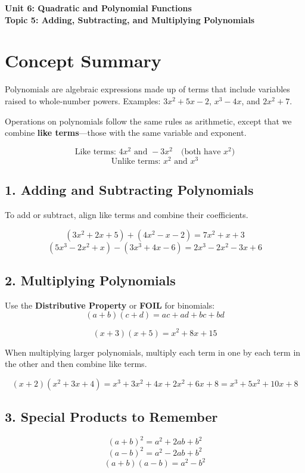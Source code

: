 \documentclass[12pt]{article}
\begin{document}
\begin{center}
    \LARGE \textbf{Unit 6: Quadratic and Polynomial Functions} \\[6pt]
    \Large \textbf{Topic 5: Adding, Subtracting, and Multiplying Polynomials}
\end{center}

\vspace{1em}

\section*{Concept Summary}

Polynomials are algebraic expressions made up of terms that include variables raised to whole-number powers.  
Examples: \(3x^2 + 5x - 2\), \(x^3 - 4x\), and \(2x^2 + 7\).

Operations on polynomials follow the same rules as arithmetic, except that we combine \textbf{like terms}—those with the same variable and exponent.

\[
\text{Like terms: } 4x^2 \text{ and } -3x^2 \quad \text{(both have } x^2\text{)}
\]
\[
\text{Unlike terms: } x^2 \text{ and } x^3
\]

\subsection*{1. Adding and Subtracting Polynomials}
To add or subtract, align like terms and combine their coefficients.

\[
(3x^2 + 2x + 5) + (4x^2 - x - 2) = 7x^2 + x + 3
\]
\[
(5x^3 - 2x^2 + x) - (3x^3 + 4x - 6) = 2x^3 - 2x^2 - 3x + 6
\]

\subsection*{2. Multiplying Polynomials}
Use the \textbf{Distributive Property} or \textbf{FOIL} for binomials:
\[
(a + b)(c + d) = ac + ad + bc + bd
\]

\[
(x + 3)(x + 5) = x^2 + 8x + 15
\]

When multiplying larger polynomials, multiply each term in one by each term in the other and then combine like terms.

\[
(x + 2)(x^2 + 3x + 4) = x^3 + 3x^2 + 4x + 2x^2 + 6x + 8 = x^3 + 5x^2 + 10x + 8
\]

\subsection*{3. Special Products to Remember}
\[
(a + b)^2 = a^2 + 2ab + b^2
\]
\[
(a - b)^2 = a^2 - 2ab + b^2
\]
\[
(a + b)(a - b) = a^2 - b^2
\]
\end{document}
